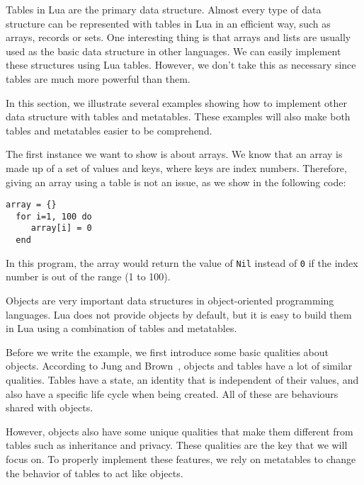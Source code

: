 Tables in Lua are the primary data structure. Almost every type of data structure can be represented with tables in Lua in an efficient way, such as arrays, records or sets. One interesting thing is that arrays and lists are usually used as the basic data structure in other languages. We can easily implement these structures using Lua tables. However, we don't take this as necessary since tables are much more powerful than them.

In this section, we illustrate several examples showing how to implement other data structure with tables and metatables. These examples will also make both tables and metatables easier to be comprehend.

The first instance we want to show is about arrays. We know that an array is made up of a set of values and keys, where keys are index numbers. Therefore, giving an array using a table is not an issue, as we show in the following code:
\begin{flushleft}
\tt array = \{\} \\
\tt ~~for i=1, 100 do\\
\tt ~~~~ array[i] = 0\\
\tt ~~end\\
\end{flushleft}
In this program, the array would return the value of {\tt Nil} instead of {\tt 0} if the index number is out of the range (1 to 100).

Objects are very important data structures in object-oriented programming languages. Lua does not provide objects by default, but it is easy to build them in Lua using a combination of tables and metatables.

Before we write the example, we first introduce some basic qualities about objects. According to Jung and Brown~\cite{begLua}, objects and tables have a lot of similar qualities. Tables have a state, an identity that is independent of their values, and also have a specific life cycle when being created. All of these are behaviours shared with objects.

However, objects also have some unique qualities that make them different from tables such as inheritance and privacy. These qualities are the key that we will focus on.
To properly implement these features, we rely on metatables to change the behavior of tables to act like objects.

